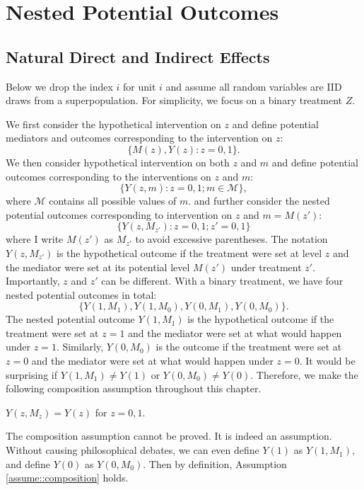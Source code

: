 \section{Nested Potential Outcomes}


\subsection{Natural Direct and Indirect Effects}
Below we drop the index $i$ for unit $i$ and assume all random variables are IID draws from a superpopulation. For simplicity, we focus on a binary treatment $Z$. 

 
We first consider the hypothetical intervention on $z$ and define potential mediators and outcomes corresponding to the intervention on $z$:
$$
\{ M(z) , Y(z): z=0,1\}.
$$
We then consider hypothetical intervention on both $z$ and $m$ and define potential outcomes corresponding to the interventions on $z$ and $m$:
$$
\{ Y(z, m): z=0, 1; m \in \mathcal{M}  \},
$$
where $ \mathcal{M} $ contains all possible values of $m$. 
\citet{Robins::1992} and \citet{Pearl::2001} further consider the nested potential outcomes corresponding to intervention on $z$ and $m = M(z')  $:
$$
\{ Y(z, M_{z'}) : z = 0,1; z'=0,1   \}
$$
where I write $M(z')$ as $ M_{z'}$ to avoid excessive parentheses. The notation $Y(z, M_{z'})$ is the hypothetical outcome if the treatment were set at level $z$ and the mediator were set at its potential level $M(z')$ under treatment $z'$. Importantly, $z$ and $z'$ can be different.
With a binary treatment, we have four nested potential outcomes in total:
$$
\{ Y( 1, M_1),    Y( 1, M_0),  Y( 0, M_1),  Y( 0, M_0) \}.
$$
The nested potential outcome  $Y(1, M_1)$ is the hypothetical outcome if the treatment were set at $z=1$ and the mediator were set at what would happen under $z=1$. Similarly, $Y(0, M_0)$ is the outcome if the treatment were set at $z=0$ and the mediator were set at what would happen under $z=0$. It would be surprising if $Y(1, M_1) \neq  Y(1)$ or $Y(0, M_0) \neq  Y(0)$.
Therefore, we make the following composition assumption throughout this chapter.

\begin{assumption}
[composition]\label{assume::composition}
$Y(z, M_z) =   Y(z)$ for $z=0,1$. 
\end{assumption}


The composition assumption cannot be proved. It is indeed an assumption. Without causing philosophical debates, we can even define $Y(1)$ as  $Y(1, M_1)$, and define $ Y(0)$ as $Y(0, M_0) $.  Then by definition, Assumption \ref{assume::composition} holds. 



